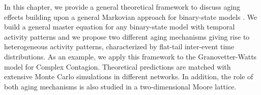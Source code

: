 In this chapter, we provide a general theoretical framework to discuss aging effects building upon a general Markovian approach for binary-state models \cite{gleeson-2011,gleeson-2013}. We build a general master equation for any binary-state model with temporal activity patterns and we propose two different aging mechanisms giving rise to heterogeneous activity patterns, characterized by flat-tail inter-event time distributions. As an example, we apply this framework to the Granovetter-Watts model for Complex Contagion.
Theoretical predictions are matched with extensive Monte Carlo simulations in different networks. In addition, the role of both aging mechanisms is also studied in a two-dimensional Moore lattice. 

